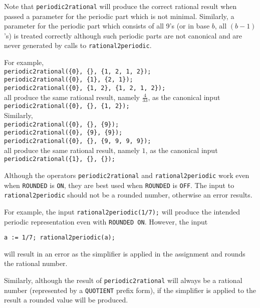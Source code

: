 Note that \texttt{periodic2rational} will produce the correct rational result
when passed a parameter for the periodic part which is not minimal.
Similarly, a parameter for the periodic part which consists of all 9's
(or in base $b$, all $(b-1)$'s) is treated correctly although such periodic
parts are not canonical and are never generated by calls to
\texttt{rational2periodic}.

\begin{tabbing}
For example,\\
\hspace{10mm}\= \texttt{periodic2rational(\{0\}, \{\}, \{1, 2, 1, 2\});} \\
    \> \texttt{periodic2rational(\{0\}, \{1\}, \{2, 1\});} \\
    \> \texttt{periodic2rational(\{0\}, \{1, 2\}, \{1, 2, 1, 2\});} \\[\baselineskip]
all produce the same rational result, namely $\frac{4}{33}$, as the canonical input\\
    \> \texttt{periodic2rational(\{0\}, \{\}, \{1, 2\});}\\[\baselineskip]
Similarly,\\
    \> \texttt{periodic2rational(\{0\}, \{\}, \{9\});} \\
    \> \texttt{periodic2rational(\{0\}, \{9\}, \{9\});} \\
    \> \texttt{periodic2rational(\{0\}, \{\}, \{9, 9, 9, 9\});} \\
all produce the same rational result, namely $1$, as the  canonical input\\
    \> \texttt{periodic2rational(\{1\}, \{\}, \{\});}
\end{tabbing}

Although the operators \texttt{periodic2rational} and
\texttt{rational2periodic} work even when \texttt{ROUNDED} is \texttt{ON},
they are best used when \texttt{ROUNDED} is \texttt{OFF}. The input
to \texttt{rational2periodic} should not be a rounded number, otherwise
an error results.

For example, the input \texttt{rational2periodic(1/7);} will produce the
intended periodic representation even with \texttt{ROUNDED ON}. However,
 the input

\texttt{a := 1/7; rational2periodic(a);}

will result in an error as the simplifier is applied in the assignment and
rounds the rational number.

Similarly, although the result of \texttt{periodic2rational} will always be
a rational number (represented by a \texttt{QUOTIENT} prefix form), if the
simplifier is applied to the result a rounded value will be produced.

